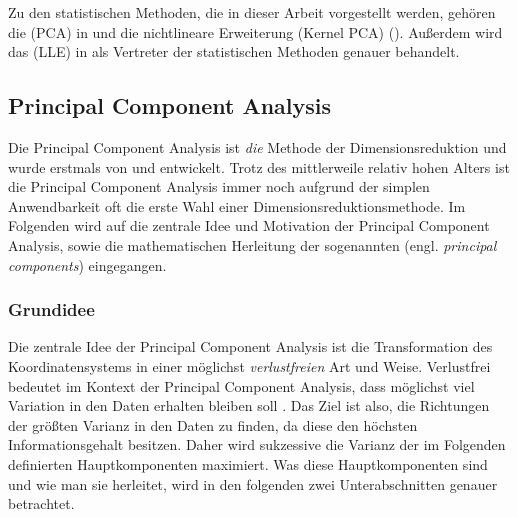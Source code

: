 Zu den statistischen Methoden, die in dieser Arbeit vorgestellt werden, gehören die
 (PCA) in 
und die nichtlineare Erweiterung  (Kernel PCA)
(). Außerdem wird das  (LLE) in  als Vertreter der
statistischen Methoden genauer behandelt.

\subsection{Principal Component Analysis}
\label{ch:MethodenDerDimRed:statistisch:PCA}

Die Principal Component Analysis ist \textit{die} Methode der Dimensionsreduktion und wurde
erstmals von \textcite{Pearson.1901} und \textcite{Hotelling.1933} entwickelt. Trotz des
mittlerweile relativ hohen Alters ist die Principal Component Analysis immer noch aufgrund der
simplen Anwendbarkeit oft die erste Wahl einer Dimensionsreduktionsmethode. Im Folgenden wird auf
die zentrale Idee und Motivation der Principal Component Analysis, sowie die mathematischen
Herleitung der sogenannten  (engl. \textit{principal components})
eingegangen.

\subsubsection{Grundidee}
\label{ch:MethodenDerDimRed:statistisch:PCA:Grundidee}
Die zentrale Idee der Principal Component Analysis ist die Transformation des Koordinatensystems in einer möglichst \textit{verlustfreien} Art und Weise. Verlustfrei bedeutet im Kontext der Principal Component Analysis, dass möglichst viel Variation in den Daten erhalten bleiben soll \parencite[vgl.][1]{Jolliffe.2002}. Das Ziel ist also, die Richtungen der größten Varianz in den Daten
zu finden, da diese den höchsten Informationsgehalt besitzen. Daher wird sukzessive die Varianz der
im Folgenden definierten Hauptkomponenten maximiert. Was diese Hauptkomponenten sind und wie man
sie herleitet, wird in den folgenden zwei Unterabschnitten genauer betrachtet.

